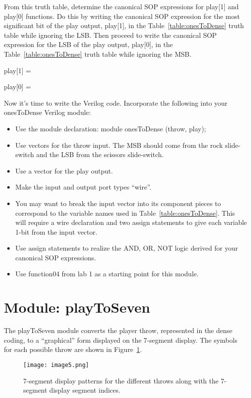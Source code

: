 From this truth table, determine the canonical SOP expressions for
play{[}1{]} and play{[}0{]} functions. Do this by writing the canonical
SOP expression for the most significant bit of the play output,
play{[}1{]}, in the Table~\ref{table:onesToDense} truth table while ignoring the LSB. Then
proceed to write the canonical SOP expression for the LSB of the play
output, play{[}0{]}, in the Table~\ref{table:onesToDense} truth table while ignoring the MSB.

\protect\hypertarget{ones2Dense_CanonicalSOP}{}{}play{[}1{]} =

play{[}0{]} =

\protect\hypertarget{ones2Dense_Verilog}{}{}Now it's time to write the
Verilog code. Incorporate the following into your onesToDense Verilog
module:

\begin{itemize}
\item
  Use the module declaration: module onesToDense (throw, play);
\item
  Use vectors for the throw input. The MSB should come from the rock
  slide-switch and the LSB from the scissors slide-switch.
\item
  Use a vector for the play output.
\item
  Make the input and output port types ``wire''.
\item
  You may want to break the input vector into its component pieces to
  correspond to the variable names used in Table~\ref{table:onesToDense}.
   This will require
  a wire declaration and two assign statements to give each variable
  1-bit from the input vector.
\item
  Use assign statements to realize the AND, OR, NOT logic derived for
  your canonical SOP expressions.
\item
  Use function04 from lab 1 as a starting point for this module.
\end{itemize}

\hypertarget{playtoseven-module}{%
\section{Module: playToSeven}
\label{playtoseven-module}}

The playToSeven module converts the player throw, represented in the
dense coding, to a ``graphical'' form displayed on the 7-segment
display. The symbols for each possible throw are shown in Figure~\ref{figure:throw7seg}.

\begin{figure}[ht]
\texttt{[image:  image5.png]}
\caption{7-segment display patterns for the different throws along with
the 7-segment display segment indices.}
\label{figure:throw7seg}
\end{figure}

